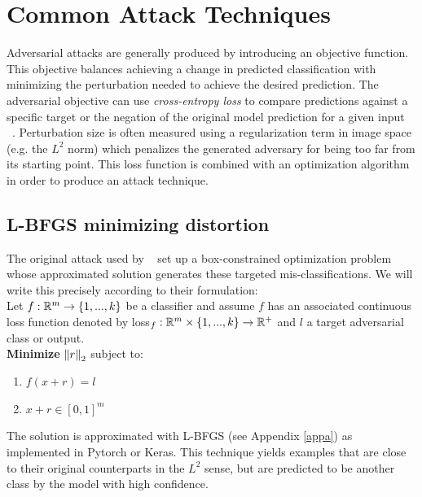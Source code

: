 \section{Common Attack Techniques}
Adversarial attacks are generally produced by introducing an objective
function. This objective balances achieving a change in predicted
classification with minimizing the perturbation needed to achieve the
desired prediction. The adversarial objective can use \emph{cross-entropy
loss} to compare predictions against a specific target or the negation
of the original model prediction for a given input
~\citep{good1963maximum}. Perturbation size is often measured using a
regularization term in image space (e.g. the $L^2$ norm) which
penalizes the generated adversary for being too far from its starting
point. This loss function is combined with an optimization algorithm
in order to produce an attack technique. 

\subsection{L-BFGS minimizing distortion}\label{lbfgs}

The original attack used by ~\citet{szegedy2013} set up a
box-constrained optimization problem whose approximated solution
generates these targeted mis-classifications. We will write this
precisely according to their formulation: \\

Let $f : \mathbb{R}^m \to \{1,...,k\}$ be a classifier and assume $f$ has an
associated continuous loss function denoted by loss$_f : \mathbb{R}^m \times
\{1,...,k\} \to \mathbb{R}^+$ and $l$ a target adversarial class or output. \\
\textbf{ Minimize} $\left\Vert r \right\Vert_2$ subject to:
\begin{enumerate}[1.]
\item $f(x + r) = l$
\item $x + r \in [0,1]^m$
\end{enumerate}

The solution is approximated with L-BFGS (see Appendix \ref{appa}) as
implemented in Pytorch or Keras. This technique yields examples that
are close to their original counterparts in the $L^2$ sense, but are
predicted to be another class by the model with high confidence.  \\



